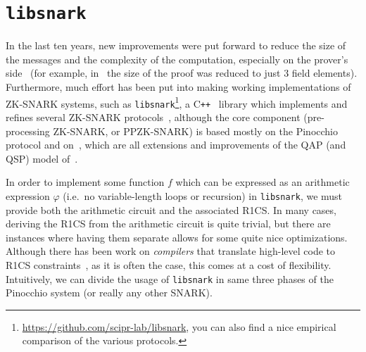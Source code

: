 \section{\texttt{libsnark}}
In the last ten years, new improvements were put forward to reduce the size of the messages and 
the complexity of the computation, especially on the prover's side~\cite{Lipmaa2013} (for example, 
in~\cite{Groth2016} the size of the proof was reduced to just \(3\) field elements).
Furthermore, much effort has been put into making working implementations of ZK-SNARK 
systems, such as \texttt{libsnark}\footnote{\url{https://github.com/scipr-lab/libsnark}, you can 
also find a nice empirical comparison of the various protocols.}, 
a C\texttt{++}~\cite{Stroustrup2013} library which implements and refines several ZK-SNARK 
protocols~\cite{DanezisFGK2014,GrothM2017,BackesBFR2014,SassonCGTV2013}, although the core 
component (pre-processing ZK-SNARK, or PPZK-SNARK) is based mostly on the Pinocchio protocol and 
on~\cite{SassonCTV2013,Groth2016}, which are all extensions and improvements of the QAP (and QSP) 
model of~\cite{GennaroGPR2012}.

In order to implement some function \(f\) which can be expressed as an 
arithmetic expression \(\varphi \) (i.e.\ no variable-length loops or recursion) in 
\texttt{libsnark}, we must provide both the arithmetic circuit and the associated R1CS\@.
In many cases, deriving the R1CS from the arithmetic circuit is quite trivial, but there are 
instances where having them separate allows for some quite nice optimizations.
Although there has been work on \emph{compilers} that translate high-level code to R1CS 
constraints~\cite{EberhardtT2018,BellesBDM2022}, as it is often the case, this comes at a cost 
of flexibility.
Intuitively, we can divide the usage of \texttt{libsnark} in same three phases of the Pinocchio 
system (or really any other SNARK).

